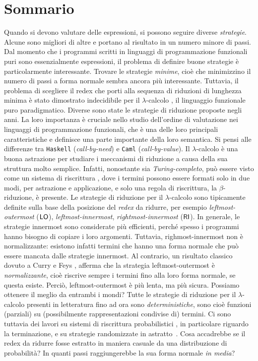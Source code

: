\pagebreak

\chapter*{Sommario}
Quando si devono valutare delle espressioni, si possono seguire diverse \emph{strategie}.
Alcune sono migliori di altre e portano al risultato in un numero
minore di passi. Dal momento che i programmi scritti in linguaggi di
programmazione funzionali puri sono essenzialmente espressioni, il problema
di definire buone strategie è particolarmente interessante. Trovare le
strategie \emph{minime}, cioè che minimizzino il numero di passi a forma
normale sembra ancora più interessante. Tuttavia, il problema di scegliere il
redex che porti alla sequenza di riduzioni di lunghezza minima è stato dimostrato
indecidibile per il $\lambda$-calcolo
\cite[Section~13.5]{barendregt_lambda_1984}, il
linguaggio funzionale puro paradigmatico. Diverse sono state le strategie di riduzione proposte
negli anni. La loro importanza è cruciale nello studio dell'ordine di valutazione
nei linguaggi di programmazione funzionali, che è una delle loro principali
caratteristiche e definisce una parte importante della loro semantica.
Si pensi alle differenze tra
\texttt{Haskell} (\emph{call-by-need}) e \texttt{Caml}
(\emph{call-by-value}). Il $\lambda$-calcolo è una buona astrazione per
studiare i meccanismi di riduzione a causa della sua struttura molto
semplice. Infatti, nonostante sia \emph{Turing-completo}, può essere visto
come un sistema di riscrittura \cite{terese_term_2003}, dove i termini
possono essere formati solo in due modi, per astrazione e applicazione, e
solo una regola di riscrittura, la $\beta$-riduzione, è presente. Le strategie
di riduzione per il $\lambda$-calcolo sono tipicamente definite sulla base della
posizione del \emph{redex} da ridurre, per esempio \emph{leftmost-outermost} ($\textsf{LO}$),
\emph{leftmost-innermost}, \emph{rightmost-innermost} ($\textsf{RI}$).
In generale, le strategie innermost sono considerate più efficienti, perché
spesso i programmi hanno bisogno di copiare i loro argomenti. Tuttavia,
righmost-innermost non è normalizzante: esistono infatti termini che hanno
una forma normale che può essere mancata dalle strategie innermost. Al 
contrario, un risultato classico dovuto a Curry e Feys
\cite{curry_combinatory_1958}, afferma che la strategia leftmost-outermost è
\emph{normalizzante}, cioè riscrive sempre i termini fino alla loro forma normale,
se questa esiste. Perciò, leftmost-outermost è più lenta, ma più sicura.
Possiamo ottenere il meglio da entrambi i mondi?  Tutte le strategie di 
riduzione per il $\lambda$-calcolo presenti in letteratura fino ad ora sono
\emph{deterministiche}, sono cioè funzioni (parziali) su
(possibilmente rappresentazioni condivise di) termini. Ci sono tuttavia
dei lavori su sistemi di riscrittura probabilistici
\cite{bournez_proving_2005,ferrer_fioriti_probabilistic_2015,avanzini_probabilistic_2018},
in particolare riguardo la terminazione, e su strategie randomizzate in astratto~\cite{bournez_probabilistic_2002}. Cosa accadrebbe se il redex da ridurre fosse estratto in maniera casuale da una
distribuzione di probabilità? In quanti passi raggiungerebbe la sua forma
normale \emph{in media}?

